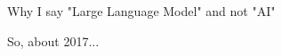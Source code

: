 \documentclass{beamer}
\begin{document}
\begin{frame}
	Why I say "Large Language Model" and not "AI"
\end{frame}







\begin{frame}
	So, about 2017...
\end{frame}

\begin{frame}[plain]
\end{frame}
\end{document}
